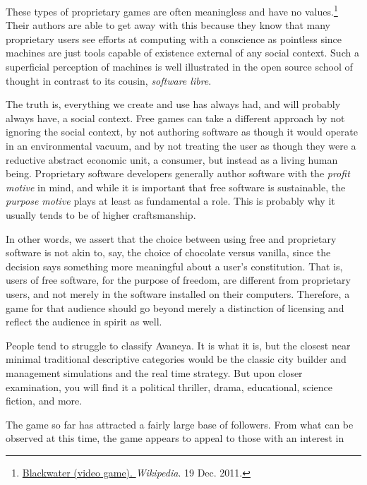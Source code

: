 These types of proprietary games are often meaningless and have no values.\footnote{\href{https://secure.wikimedia.org/wikipedia/en/wiki/Blackwater_\%28video_game\%29}{Blackwater (video game). }{\it Wikipedia}. 19 Dec. 2011.} Their authors are able to get away with this because they know that many proprietary users see efforts at computing with a conscience as pointless since machines are just tools capable of existence external of any social context. Such a superficial perception of machines is well illustrated in the open source school of thought in contrast to its cousin, {\it software libre}. 

The truth is, everything we create and use has always had, and will probably always have, a social context. Free games can take a different approach by not ignoring the social context, by not authoring software as though it would operate in an environmental vacuum, and by not treating the user as though they were a reductive abstract economic unit, a consumer, but instead as a living human being. Proprietary software developers generally author software with the {\it profit motive} in mind, and while it is important that free software is sustainable, the {\it purpose motive} plays at least as fundamental a role. This is probably why it usually tends to be of higher craftsmanship.

In other words, we assert that the choice between using free and proprietary software is not akin to, say, the choice of chocolate versus vanilla, since the decision says something more meaningful about a user's constitution. That is, users of free software, for the purpose of freedom, are different from proprietary users, and not merely in the software installed on their computers. Therefore, a game for that audience should go beyond merely a distinction of licensing and reflect the audience in spirit as well.

People tend to struggle to classify Avaneya. It is what it is, but the closest near minimal traditional descriptive categories would be the classic city builder and management simulations and the real time strategy. But upon closer examination, you will find it a political thriller, drama, educational, science fiction, and more.

The game so far has attracted a fairly large base of followers. From what can be observed at this time, the game appears to appeal to those with an interest in

